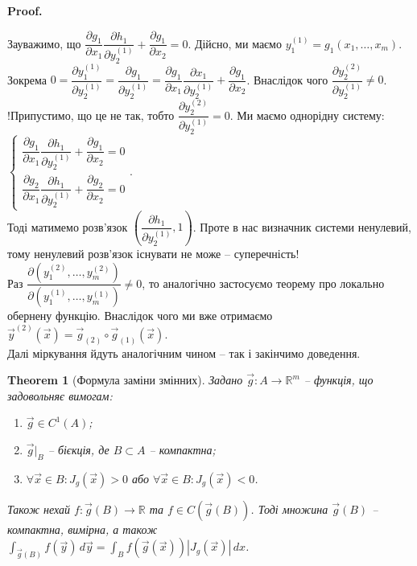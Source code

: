 \documentclass[a4paper, 10pt]{article}
\makeatletter
\def\departial#1#2{\dfrac{\partial {#1}}{\partial {#2}}}
\def\qed{$\blacksquare$}
\theoremstyle{theoremdd}
\newtheorem{theorem}{Theorem}[subsection]
\theoremstyle{theoremdd}
\theoremstyle{theoremdd}
\theoremstyle{theoremdd}
\theoremstyle{theoremdd}
\theoremstyle{theoremdd}
\theoremstyle{theoremdd}
\theoremstyle{theoremdd}
\theoremstyle{theoremdd}
\theoremstyle{theoremdd}
\theoremstyle{theoremdd}
\theoremstyle{theoremdd}
\theoremstyle{theoremdd}
\theoremstyle{theoremdd}
\theoremstyle{theoremdd}
\renewenvironment{proof}[1][Proof.\\]{\par
\pushQED{\hfill \qed}%
\normalfont \topsep6\p@\@plus6\p@\relax
\trivlist
\item\relax
{\bfseries
#1\@addpunct{.}}\hspace\labelsep\ignorespaces
}{%
\popQED\endtrivlist\@endpefalse
}
\makeatother
\begin{document}
\begin{proof}
Зауважимо, що $\dfrac{\partial g_1}{\partial x_1} \dfrac{\partial h_1}{\partial y_2^{(1)}} + \dfrac{\partial g_1}{\partial x_2} = 0$. Дійсно, ми маємо $y_1^{(1)} = g_1(x_1,\dots,x_m)$. Зокрема $0 = \departial{y_1^{(1)}}{y_2^{(1)}} = \departial{g_1}{y_2^{(1)}} = \dfrac{\partial g_1}{\partial x_1} \dfrac{\partial x_1}{\partial y_2^{(1)}} + \dfrac{\partial g_1}{\partial x_2}$. Внаслідок чого $\dfrac{\partial y_2^{(2)}}{\partial y_2^{(1)}} \neq 0$.\\
!Припустимо, що це не так, тобто $\dfrac{\partial y_2^{(2)}}{\partial y_2^{(1)}} = 0$. Ми маємо однорідну систему:\\
$\begin{cases}
\dfrac{\partial g_1}{\partial x_1} \dfrac{\partial h_1}{\partial y_2^{(1)}} + \dfrac{\partial g_1}{\partial x_2} = 0 \\
\dfrac{\partial g_2}{\partial x_1} \dfrac{\partial h_1}{\partial y_2^{(1)}} + \dfrac{\partial g_2}{\partial x_2} = 0
\end{cases}$.\\
Тоді матимемо розв'язок $\left( \dfrac{\partial h_1}{\partial y_2^{(1)}},1 \right)$. Проте в нас визначник системи ненулевий, тому ненулевий розв'язок існувати не може -- суперечність!\\
Раз $\dfrac{\partial(y_1^{(2)},\dots,y_m^{(2)})}{\partial(y_1^{(1)},\dots,y_m^{(1)})} \neq 0$, то аналогічно застосуємо теорему про локально обернену функцію. Внаслідок чого ми вже отримаємо $\vec{y}^{(2)}(\vec{x}) = \vec{g}_{(2)} \circ \vec{g}_{(1)}(\vec{x})$.\\
Далі міркування йдуть аналогічним чином -- так і закінчимо доведення.
\end{proof}

\begin{theorem}[Формула заміни змінних]
Задано $\vec{g} \colon A \to \mathbb{R}^m$ -- функція, що задовольняє вимогам:
\begin{enumerate}[nosep,wide=0pt,label={\arabic*)}]
\item $\vec{g} \in C^1(A)$;
\item $\vec{g}|_B$ -- бієкція, де $B \subset A$ -- компактна;
\item $\forall \vec{x} \in B: J_g(\vec{x}) > 0$ або $\forall \vec{x} \in B: J_g(\vec{x}) < 0$.
\end{enumerate}
Також нехай $f \colon \vec{g}(B) \to \mathbb{R}$ та $f \in C(\vec{g}(B))$. Тоді множина $\vec{g}(B)$ -- компактна, вимірна, а також\\
$\displaystyle\int_{\vec{g}(B)} f(\vec{y})\,d\vec{y} = \int_B f(\vec{g}(\vec{x})) |J_g(\vec{x})|\,dx$.
\end{theorem}
\end{document}
